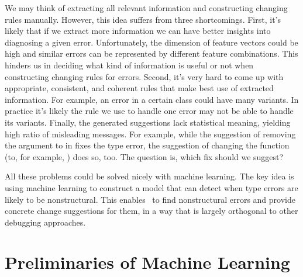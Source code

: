 \documentclass[12pt]{report}	%
\begin{document}
We may think of extracting all relevant information and
constructing changing rules manually. However, this
idea suffers from three shortcomings.
%
First, it's likely that if we extract more information we
can have better insights into diagnosing a given error.
Unfortunately, the dimension of feature vectors could be high
and similar errors can be represented by different feature
combinations. This hinders us in deciding what kind of
information is useful or not when constructing
changing rules for errors.
%
Second, it's very hard to come up with appropriate, consistent, and
coherent rules that make best use of extracted information.
%
For example, an error in a certain class
could have many variants. In practice it's likely
the rule we use to handle one error may not be able to handle its variants.
%
Finally, the generated suggestions lack statistical meaning,
yielding high ratio of misleading messages. For example,
while the suggestion of removing the argument  to
 in  fixes the type error, the suggestion
of changing the function  (to, for example, )
does so, too. The question is, which fix should we suggest?

All these problems could be solved nicely with machine learning.
The key idea is using
machine learning to construct
a model that can detect when type errors are likely
to be nonstructural.
This enables \newCompiler\ to find nonstructural errors and 
provide concrete change suggestions for them, 
in a way that is largely orthogonal to other debugging approaches.

\section{Preliminaries of Machine Learning}
\label{sec:ml:back}
\end{document}
